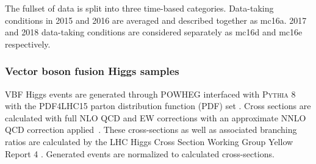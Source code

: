 

The fullset of data is split into three time-based categories. Data-taking conditions in 2015 and 2016 are averaged and described together as mc16a. 2017 and 2018 data-taking conditions are considered separately as mc16d and mc16e respectively. 

\subsubsection{Vector boson fusion Higgs samples}

VBF Higgs events are generated through \textsc{POWHEG} \cite{Nason:2009ai} interfaced with \textsc{Pythia} 8 with the PDF4LHC15 parton distribution function (PDF) set \cite{PDF4LHC15}. Cross sections are calculated with full NLO QCD and EW corrections \cite{Ciccolini:2007jr, Arnold:2008rz} with an approximate NNLO QCD correction applied~\cite{Bolzoni:2010xr}. These cross-sections as well as associated branching ratios are calculated by the LHC Higgs Cross Section Working Group Yellow Report 4 \cite{LHCCrossSectionWG}. Generated events are normalized to calculated cross-sections. %
